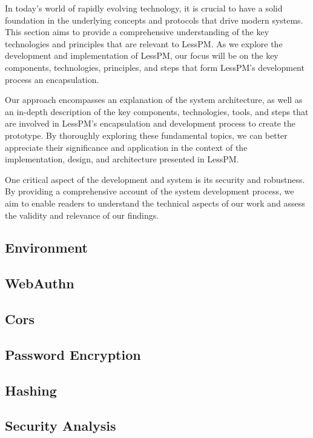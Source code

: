 
In today's world of rapidly evolving technology, it is crucial to have a
solid foundation in the underlying concepts and protocols that drive modern
systems.
This section aims to provide a comprehensive understanding of the key
technologies and principles that are relevant to LessPM\@.
As we explore the development and implementation of LessPM, our focus will be
on the key components, technologies, principles, and steps that form LessPM's
development process an encapsulation.

Our approach encompasses an explanation of the system architecture, as well as
an in-depth description of the key components, technologies, tools, and steps
that are involved in LessPM's encapsulation and development process to create
the prototype.
By thoroughly exploring these fundamental topics, we can better appreciate their
significance and application in the context of the implementation, design, and
architecture presented in LessPM\@.

One critical aspect of the development and system is its security and
robustness.
By providing a comprehensive account of the system development process, we aim
to enable readers to understand the technical aspects of our work and assess the
validity and relevance of our findings.

\subsection{Environment}\label{subsec:environment}


\subsection{WebAuthn}\label{subsec:webauthn-methodology}


\subsection{Cors}\label{subsec:cors}


\subsection{Password Encryption}\label{subsec:password-encryption}


\subsection{Hashing}\label{subsec:hashing}


\subsection{Security Analysis}\label{subsec:security-analysis}


